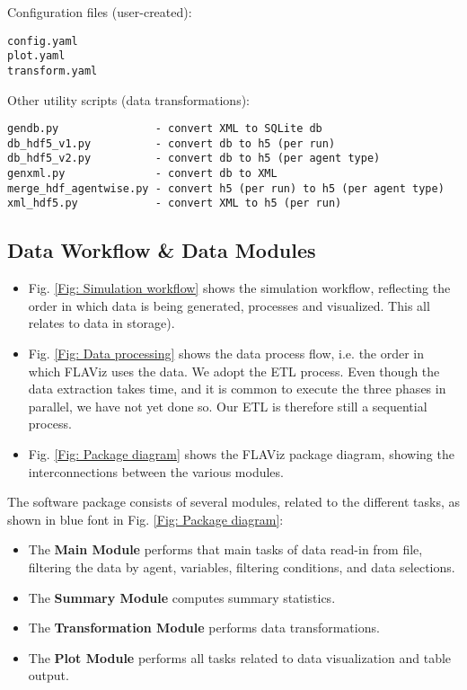\documentclass[10pt,a4paper]{article}
\begin{document}
Configuration files (user-created):
\begin{verbatim}
config.yaml
plot.yaml
transform.yaml
\end{verbatim}

Other utility scripts (data transformations):
\begin{verbatim}
gendb.py               - convert XML to SQLite db
db_hdf5_v1.py          - convert db to h5 (per run)
db_hdf5_v2.py          - convert db to h5 (per agent type)
genxml.py              - convert db to XML
merge_hdf_agentwise.py - convert h5 (per run) to h5 (per agent type)
xml_hdf5.py            - convert XML to h5 (per run)
\end{verbatim}


\subsection{Data Workflow \& Data Modules}

\begin{itemize}
\item Fig. \ref{Fig: Simulation workflow} shows the simulation workflow, reflecting the order in which data is being generated, processes and visualized. This all relates to data in storage).

\item Fig. \ref{Fig: Data processing} shows the data process flow, i.e. the order in which FLAViz uses the data. We adopt the ETL process. Even though the data extraction takes time, and it is common to execute the three phases in parallel, we have not yet done so. Our ETL is therefore still a sequential process.

\item Fig. \ref{Fig: Package diagram} shows the FLAViz package diagram, showing the interconnections between the various modules.
\end{itemize}

The software package consists of several modules, related to the different tasks, as shown in blue font in Fig. \ref{Fig: Package diagram}:

\begin{itemize}
\item The \textbf{Main Module} performs that main tasks of data read-in from file, filtering the data by agent, variables, filtering conditions, and data selections.

\item The \textbf{Summary Module} computes summary statistics.

\item The \textbf{Transformation Module} performs data transformations.

\item The \textbf{Plot Module} performs all tasks related to data visualization and table output.
\end{itemize}
\end{document}
